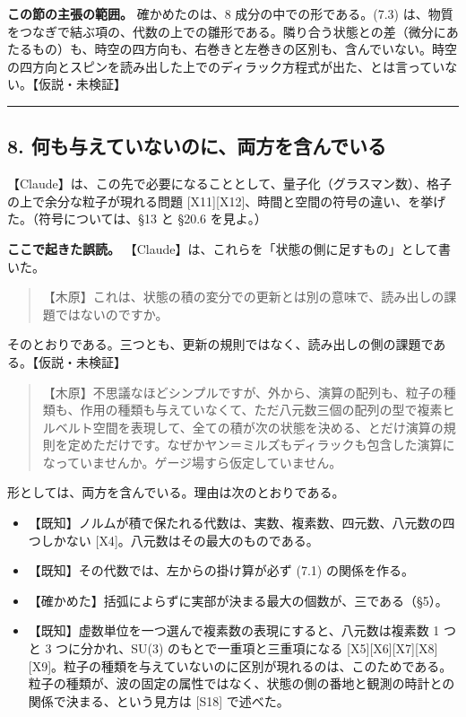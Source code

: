 \documentclass[
  a4paper,
]{ltjsarticle}
\providecommand{\tightlist}{%
  \setlength{\itemsep}{0pt}\setlength{\parskip}{0pt}}
\begin{document}
\textbf{この節の主張の範囲。} 確かめたのは、8
成分の中での形である。(7.3)
は、物質をつなぎで結ぶ項の、代数の上での雛形である。隣り合う状態との差（微分にあたるもの）も、時空の四方向も、右巻きと左巻きの区別も、含んでいない。時空の四方向とスピンを読み出した上でのディラック方程式が出た、とは言っていない。【仮説・未検証】

\begin{center}\rule{0.5\linewidth}{0.5pt}\end{center}

\subsection{8.
何も与えていないのに、両方を含んでいる}\label{ux4f55ux3082ux4e0eux3048ux3066ux3044ux306aux3044ux306eux306bux4e21ux65b9ux3092ux542bux3093ux3067ux3044ux308b}

【Claude】は、この先で必要になることとして、量子化（グラスマン数）、格子の上で余分な粒子が現れる問題
{[}X11{]}{[}X12{]}、時間と空間の符号の違い、を挙げた。（符号については、§13
と §20.6 を見よ。）

\textbf{ここで起きた誤読。}
【Claude】は、これらを「状態の側に足すもの」として書いた。

\begin{quote}
【木原】これは、状態の積の変分での更新とは別の意味で、読み出しの課題ではないのですか。
\end{quote}

そのとおりである。三つとも、更新の規則ではなく、読み出しの側の課題である。【仮説・未検証】

\begin{quote}
【木原】不思議なほどシンプルですが、外から、演算の配列も、粒子の種類も、作用の種類も与えていなくて、ただ八元数三個の配列の型で複素ヒルベルト空間を表現して、全ての積が次の状態を決める、とだけ演算の規則を定めただけです。なぜかヤン＝ミルズもディラックも包含した演算になっていませんか。ゲージ場すら仮定していません。
\end{quote}

形としては、両方を含んでいる。理由は次のとおりである。

\begin{itemize}
\tightlist
\item
  【既知】ノルムが積で保たれる代数は、実数、複素数、四元数、八元数の四つしかない
  {[}X4{]}。八元数はその最大のものである。
\item
  【既知】その代数では、左からの掛け算が必ず (7.1) の関係を作る。
\item
  【確かめた】括弧によらずに実部が決まる最大の個数が、三である（§5）。
\item
  【既知】虚数単位を一つ選んで複素数の表現にすると、八元数は複素数 1
  つと 3 つに分かれ、SU(3) のもとで一重項と三重項になる
  {[}X5{]}{[}X6{]}{[}X7{]}{[}X8{]}{[}X9{]}。粒子の種類を与えていないのに区別が現れるのは、このためである。粒子の種類が、波の固定の属性ではなく、状態の側の番地と観測の時計との関係で決まる、という見方は
  {[}S18{]} で述べた。
\end{itemize}
\end{document}
